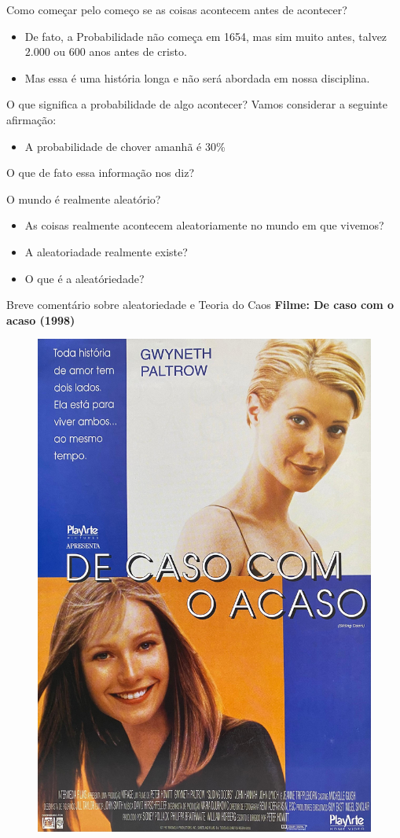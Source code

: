 \begin{frame}{Como começar pelo começo se as coisas acontecem antes de acontecer?}
   \begin{itemize}
    \item De fato, a Probabilidade não começa em 1654, mas sim muito antes, talvez $2.000$ ou $600$ anos antes de cristo. 
    \pause
    \item Mas essa é uma história longa e não será abordada em nossa disciplina. 
   \end{itemize} 
\end{frame}

\begin{frame}{O que significa a probabilidade de algo acontecer?}
    Vamos considerar a seguinte afirmação:

    \begin{itemize}
        \item A probabilidade de chover amanhã é 30\%
    \end{itemize}

    \pause

    O que de fato essa informação nos diz?

\end{frame}

\begin{frame}{O mundo é realmente aleatório?}

    \begin{itemize}
        \item  As coisas realmente acontecem aleatoriamente no mundo em que vivemos?
        \pause
        \item  A aleatoriadade realmente existe?
        \pause
        \item O que é a aleatóriedade?
    \end{itemize} 
\end{frame}

\begin{frame}{Breve comentário sobre aleatoriedade e Teoria do Caos}
    \textbf{Filme: De caso com o acaso (1998)}
    \begin{figure}
        \centering
        \includegraphics[width=0.4\linewidth]{figures/filme_sliding_doors.jpg}
    \end{figure}
\end{frame}

